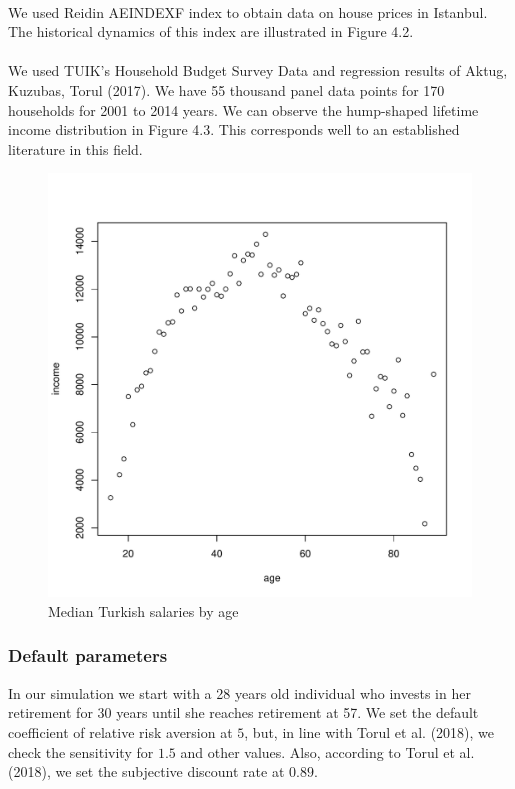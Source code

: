 \documentclass[]{elsarticle}
\begin{document}
\paragraph{}We used Reidin AEINDEXF index to obtain data on house prices in Istanbul. The historical dynamics of this index are illustrated in Figure 4.2.

\paragraph{}We used TUIK's Household Budget Survey Data and regression results of Aktug, Kuzubas, Torul (2017). We have 55 thousand panel data points for 170 households for 2001 to 2014 years. We can observe the hump-shaped lifetime income distribution in Figure 4.3. This corresponds well to an established literature in this field.

\begin{figure}[h]
	\centering
	\includegraphics[scale=0.6]{figs/wage2median.pdf}
	\caption{Median Turkish salaries by age}
\end{figure}

\subsubsection{Default parameters}
In our simulation we start with a 28 years old individual who invests in her retirement for 30 years until she reaches retirement at 57. We set the default coefficient of relative risk aversion at $5$, but, in line with Torul et al. (2018), we check the sensitivity for $1.5$ and other values. Also, according to Torul et al. (2018), we set the subjective discount rate at $0.89$.
\end{document}
